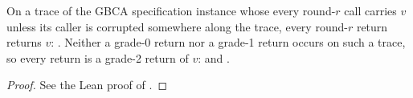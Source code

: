 \begin{theorem}
  \label{thm:gbca-spec-validity}
  \leanok
  On a trace of the GBCA specification instance whose every round-$r$ call carries $v$ unless its caller is corrupted somewhere along the trace, every round-$r$ return returns $v$: .
  Neither a grade-0 return nor a grade-1 return occurs on such a trace, so every return is a grade-2 return of $v$:  and .
\end{theorem}

\begin{proof}\leanok
  See the Lean proof of .
\end{proof}
